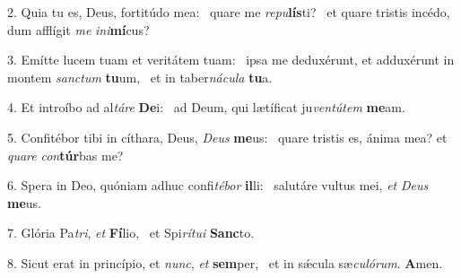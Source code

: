 2. Quia tu es, Deus, fortitúdo mea: \dag\  quare me \textit{re}\textit{pu}\textbf{lís}ti? \ast\  et quare tristis incédo, dum afflígit \textit{me} \textit{in}\textit{i}\textbf{mí}cus?\

3. Emítte lucem tuam et veritátem tuam: \dag\  ipsa me deduxérunt, et adduxérunt in montem \textit{sanc}\textit{tum} \textbf{tu}um, \ast\  et in taber\textit{ná}\textit{cu}\textit{la} \textbf{tu}a.\

4. Et introíbo ad al\textit{tá}\textit{re} \textbf{De}i: \ast\  ad Deum, qui lætíficat ju\textit{ven}\textit{tú}\textit{tem} \textbf{me}am.\

5. Confitébor tibi in cíthara, Deus, \textit{De}\textit{us} \textbf{me}us: \ast\  quare tristis es, ánima mea? et \textit{qua}\textit{re} \textit{con}\textbf{túr}bas me?\

6. Spera in Deo, quóniam adhuc confi\textit{té}\textit{bor} \textbf{il}li: \ast\  salutáre vultus mei, \textit{et} \textit{De}\textit{us} \textbf{me}us.\

7. Glória Pa\textit{tri}, \textit{et} \textbf{Fí}lio, \ast\  et Spi\textit{rí}\textit{tu}\textit{i} \textbf{Sanc}to.\

8. Sicut erat in princípio, et \textit{nunc}, \textit{et} \textbf{sem}per, \ast\  et in sǽcula sæ\textit{cu}\textit{ló}\textit{rum}. \textbf{A}men.\

